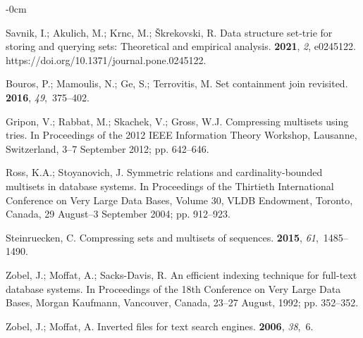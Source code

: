 \documentclass[algorithms,article,accept,pdftex,moreauthors]{Definitions/mdpi}
\begin{document}
\begin{adjustwidth}{-\extralength}{0cm}
\begin{thebibliography}{999}

Savnik, I.; Akulich, M.; Krnc, M.; Škrekovski, R.
\newblock Data structure set-trie for storing and querying sets: Theoretical
  and empirical analysis.
 {\bf 2021}, {\em 2}, e0245122. https://doi.org/10.1371/journal.pone.0245122.

Bouros, P.; Mamoulis, N.; Ge, S.; Terrovitis, M.
\newblock Set containment join revisited.
 {\bf 2016}, {\em
  49},~375--402.

Gripon, V.; Rabbat, M.; Skachek, V.; Gross, W.J.
\newblock Compressing multisets using tries.
\newblock In Proceedings of the 2012 IEEE Information Theory Workshop, Lausanne, Switzerland, 3--7 September %
  2012; pp. 642--646.

Ross, K.A.; Stoyanovich, J.
\newblock Symmetric relations and cardinality-bounded multisets in database
  systems.
\newblock In Proceedings of the Thirtieth International
  Conference on Very Large Data Bases, Volume 30, VLDB Endowment, Toronto, Canada, 29 August--3 September 2004; %
  pp. 912--923.

Steinruecken, C.
\newblock Compressing sets and multisets of sequences.
 {\bf 2015}, {\em
  61},~1485--1490.

Zobel, J.; Moffat, A.; Sacks-Davis, R.
\newblock An efficient indexing technique for full-text database systems.
\newblock In Proceedings of the 18th Conference on Very Large Data Bases, Morgan Kaufmann, Vancouver, Canada, 23--27 August, 1992; %
 pp. 352--352.

Zobel, J.; Moffat, A.  %
\newblock Inverted files for text search engines.
 {\bf 2006}, {\em 38},~6.


\end{thebibliography}
\end{adjustwidth}
\end{document}
